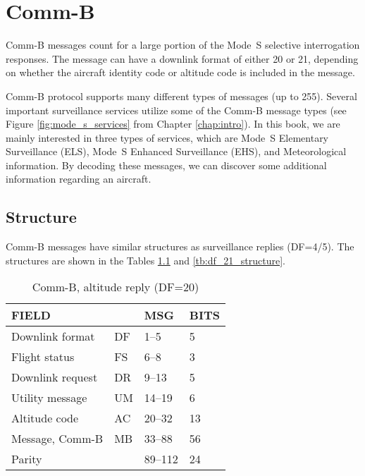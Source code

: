 \chapter{Comm-B} \label{chap:comm-b}

Comm-B messages count for a large portion of the Mode~S selective interrogation responses. The message can have a downlink format of either 20 or 21, depending on whether the aircraft identity code or altitude code is included in the message.

Comm-B protocol supports many different types of messages (up to 255). Several important surveillance services utilize some of the Comm-B message types (see Figure \ref{fig:mode_s_services} from Chapter \ref{chap:intro}). In this book, we are mainly interested in three types of services, which are Mode~S Elementary Surveillance (ELS), Mode~S Enhanced Surveillance (EHS), and Meteorological information. By decoding these messages, we can discover some additional information regarding an aircraft.


\section{Structure}

Comm-B messages have similar structures as surveillance replies (DF=4/5). The structures are shown in the Tables \ref{tb:df_20_structure} and \ref{tb:df_21_structure}.

\begin{table}[!ht]
  \centering
  \caption{Comm-B, altitude reply (DF=20)}
  \label{tb:df_20_structure}
  \begin{tabular}[t]{|l|l|l|l|}
  \hline
  \textbf{FIELD} & \textbf{} & \textbf{MSG} & \textbf{BITS} \\ \hline
  Downlink format         & DF & 1--5    & 5   \\ \hline
  Flight status           & FS & 6--8    & 3   \\ \hline
  Downlink request        & DR & 9--13   & 5   \\ \hline
  Utility message         & UM & 14--19  & 6   \\ \hline
  Altitude code           & AC & 20--32  & 13  \\ \hline
  Message, Comm-B         & MB & 33--88  & 56  \\ \hline
  Parity  &  & 89--112  & 24  \\ \hline
  \end{tabular}
\end{table}


